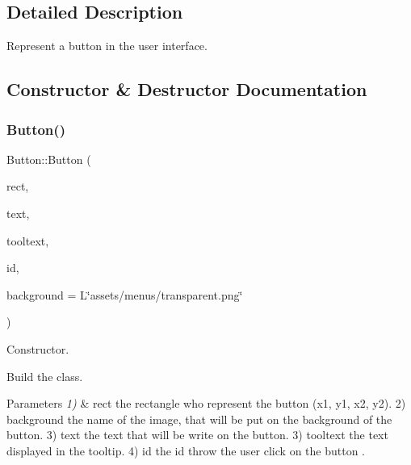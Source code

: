 \subsection{Detailed Description}
Represent a button in the user interface. 

\subsection{Constructor \& Destructor Documentation}
\mbox{\label{classButton_a5729094ff8ec4ce3e64e6691c297983c}} 
\subsubsection{\texorpdfstring{Button()}{Button()}}
{\footnotesize\ttfamily Button\+::\+Button (\begin{DoxyParamCaption}\item[{const Rect \&}]{rect,  }\item[{const wchar\+\_\+t $\ast$}]{text,  }\item[{const wchar\+\_\+t $\ast$}]{tooltext,  }\item[{enum indie\+::\+G\+U\+I\+Button\+Id}]{id,  }\item[{const wchar\+\_\+t $\ast$}]{background = {\ttfamily L\char`\"{}assets/menus/transparent.png\char`\"{}} }\end{DoxyParamCaption})}



Constructor. 

Build the class.


\begin{DoxyParams}{Parameters}
{\em 1)} & \textquotesingle{}rect\textquotesingle{} the rectangle who represent the button (x1, y1, x2, y2). 2) \textquotesingle{}background\textquotesingle{} the name of the image, that will be put on the background of the button. 3) \textquotesingle{}text\textquotesingle{} the text that will be write on the button. 3) \textquotesingle{}tooltext\textquotesingle{} the text displayed in the tooltip. 4) \textquotesingle{}id\textquotesingle{} the id throw the user click on the button . \\
\hline
\end{DoxyParams}
\mbox{\label{classButton_a2a001eb9c3cc8ae54768a850dd345002}} 
